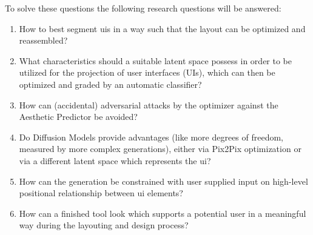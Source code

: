 \documentclass[10pt,a4paper]{scrartcl} %
\begin{document}
To solve these questions the following research questions will be answered:
\begin{enumerate}[label*=RQ \arabic*]
  \item How to best segment \acp{ui} in a way such that the layout can be optimized and reassembled?
  \item What characteristics should a suitable latent space possess in order to be utilized for the projection of user interfaces (UIs), which can then be optimized and graded by an automatic classifier?
  \item How can (accidental) adversarial attacks by the optimizer against the Aesthetic Predictor be avoided?
  \item Do Diffusion Models provide advantages (like more degrees of freedom, measured by more complex generations), either via Pix2Pix optimization or via a different latent space which represents the \ac{ui}?
  \item How can the generation be constrained with user supplied input on high-level positional relationship between \ac{ui} elements?
  \item How can a finished tool look which supports a potential user in a meaningful way during the layouting and design process?

  
\end{enumerate}
\end{document}
